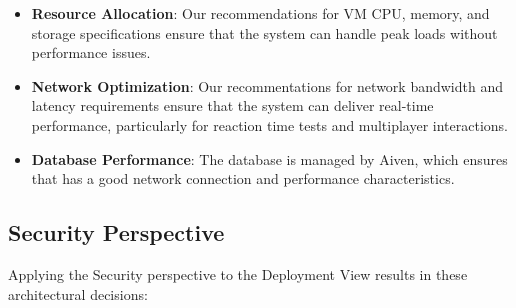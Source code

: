 \begin{itemize}

    \item \textbf{Resource Allocation}: Our recommendations for VM CPU, memory, and storage specifications ensure that the system can handle peak loads without performance issues.

    \item \textbf{Network Optimization}: Our recommentations for network bandwidth and latency requirements ensure that the system can deliver real-time performance, particularly for reaction time tests and multiplayer interactions.


    \item \textbf{Database Performance}: The database is managed by Aiven, which ensures that has a good network connection and performance characteristics.
\end{itemize}

\subsection{Security Perspective}

Applying the Security perspective to the Deployment View results in these architectural decisions:

